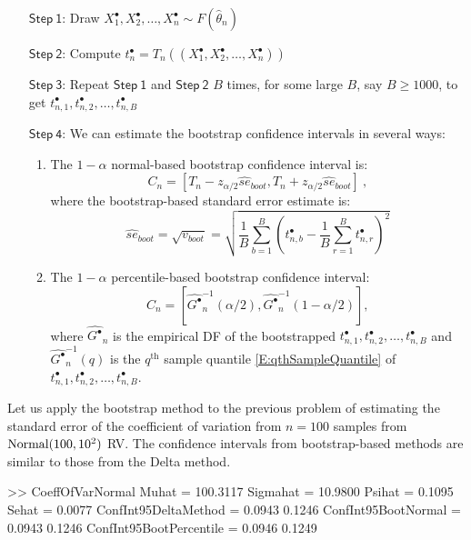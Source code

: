 \begin{enumerate}
\item[$\mathsf{Step~1}$:] Draw $X^{\bullet}_1,X^{\bullet}_2,\ldots,X^{\bullet}_n \sim F(\widehat{\theta}_n)$
\item[$\mathsf{Step~2}$:] Compute $t_n^{\bullet} = T_n((X^{\bullet}_1,X^{\bullet}_2,\ldots,X^{\bullet}_n))$
\item[$\mathsf{Step~3}$:] Repeat $\mathsf{Step~1}$ and $\mathsf{Step~2}$ $B$ times, for some large $B$, say $B\geq1000$, to get $t_{n,1}^{\bullet}, t_{n,2}^{\bullet},\ldots,t_{n,B}^{\bullet}$
\item[$\mathsf{Step~4}$:] We can estimate the bootstrap confidence intervals in several ways:
\begin{enumerate}
\item The  $1-\alpha$ normal-based bootstrap confidence interval is:
\[
C_n = [T_n - z_{\alpha/2} \widehat{se}_{boot}, T_n + z_{\alpha/2} \widehat{se}_{boot}] \ ,
\]
where the bootstrap-based standard error estimate is:
\[
\widehat{se}_{boot} = \sqrt{v_{boot}} = \sqrt{ \frac{1}{B} \sum_{b=1}^B \left(  t_{n,b}^{\bullet} - \frac{1}{B} \sum_{r=1}^B t_{n,r}^{\bullet} \right)^2}
\]
\item The $1-\alpha$ percentile-based bootstrap confidence interval:\\
\[
C_n=[\widehat{G^{\bullet}}_{n}^{-1}(\alpha/2),\widehat{G^{\bullet}}_{n}^{-1}(1-\alpha/2)] ,
\]
where $\widehat{G^{\bullet}}_{n}$ is the empirical DF of the bootstrapped $t_{n,1}^{\bullet}, t_{n,2}^{\bullet},\ldots,t_{n,B}^{\bullet}$ and $\widehat{G^{\bullet}}_{n}^{-1}(q)$ is the $q^{\text{th}}$ sample quantile \eqref{E:qthSampleQuantile} of $t_{n,1}^{\bullet}, t_{n,2}^{\bullet},\ldots,t_{n,B}^{\bullet}$.
\end{enumerate}
\end{enumerate}

Let us apply the bootstrap method to the previous problem of estimating the standard error of the coefficient of variation from $n=100$ samples from $\mbox{{\rm Normal}}(100,10^2)$ RV.  The confidence intervals from bootstrap-based methods are similar to those from the Delta method.
{}
\begin{VrbM}
>> CoeffOfVarNormal
Muhat =  100.3117
Sigmahat =   10.9800
Psihat =    0.1095
Sehat =    0.0077
ConfInt95DeltaMethod =    0.0943    0.1246
ConfInt95BootNormal =    0.0943    0.1246
ConfInt95BootPercentile =    0.0946    0.1249
\end{VrbM}
